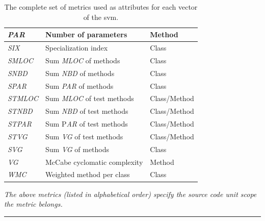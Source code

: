 \begin{table}[!tb]
\begin{threeparttable}
\begin{tabular}{|l|l|l|}
      \hline \emph{PAR} & Number of parameters & Method \\
      \hline \emph{SIX} & Specialization index & Class \\
      \hline \emph{SMLOC} & Sum \emph{MLOC} of methods & Class \\
      \hline \emph{SNBD} & Sum \emph{NBD} of methods & Class \\
      \hline \emph{SPAR} & Sum \emph{PAR} of methods & Class \\
      \hline \emph{STMLOC} & Sum \emph{MLOC} of test methods & Class/Method \\
      \hline \emph{STNBD} & Sum \emph{NBD} of test methods & Class/Method \\
      \hline \emph{STPAR} & Sum P\emph{AR} of test methods & Class/Method \\
      \hline \emph{STVG} & Sum \emph{VG} of test methods & Class/Method \\
      \hline \emph{SVG} & Sum \emph{VG} of methods & Class \\
      \hline \emph{VG} & McCabe cyclomatic complexity & Method \\
      \hline \emph{WMC} & Weighted method per class & Class \\
      \hline
    \end{tabular}
  \end{threeparttable}
  \caption{The complete set of metrics used as attributes for each vector of the \gls{svm}.}
  \vspace{1mm}
  \footnotesize{\emph{The above metrics (listed in alphabetical order) specify the source code unit scope the metric belongs.}}
  \vspace{2mm}
  \hrule
  \label{tab:metrics}
\end{table}

